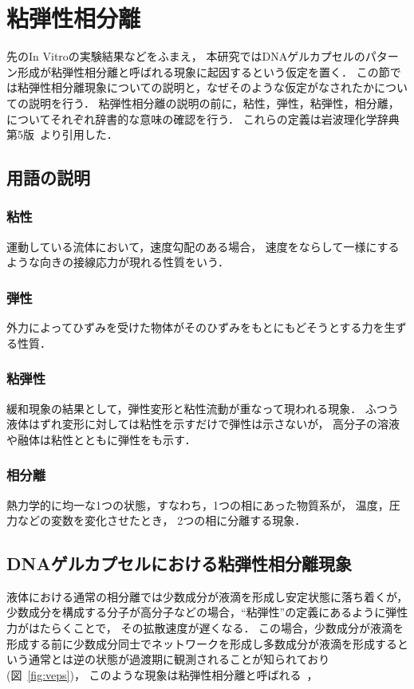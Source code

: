 \section{粘弾性相分離}

先のIn Vitroの実験結果などをふまえ，
本研究ではDNAゲルカプセルのパターン形成が粘弾性相分離と呼ばれる現象に起因するという仮定を置く．
この節では粘弾性相分離現象についての説明と，なぜそのような仮定がなされたかについての説明を行う．
粘弾性相分離の説明の前に，粘性，弾性，粘弾性，相分離，についてそれぞれ辞書的な意味の確認を行う．
これらの定義は岩波理化学辞典第5版~\cite{rikagakuiwanami}より引用した．

\subsection{用語の説明}

\subsubsection{粘性}
運動している流体において，速度勾配のある場合，
速度をならして一様にするような向きの接線応力が現れる性質をいう．

\subsubsection{弾性}
外力によってひずみを受けた物体がそのひずみをもとにもどそうとする力を生ずる性質．

\subsubsection{粘弾性}
緩和現象の結果として，弾性変形と粘性流動が重なって現われる現象．
ふつう液体はずれ変形に対しては粘性を示すだけで弾性は示さないが，
高分子の溶液や融体は粘性とともに弾性をも示す．

\subsubsection{相分離}
熱力学的に均一な1つの状態，すなわち，1つの相にあった物質系が，
温度，圧力などの変数を変化させたとき，
2つの相に分離する現象．

\subsection{DNAゲルカプセルにおける粘弾性相分離現象}
液体における通常の相分離では少数成分が液滴を形成し安定状態に落ち着くが，
少数成分を構成する分子が高分子などの場合，``粘弾性''の定義にあるように弾性力がはたらくことで，
その拡散速度が遅くなる．
この場合，少数成分が液滴を形成する前に少数成分同士でネットワークを形成し多数成分が液滴を形成するという通常とは逆の状態が過渡期に観測されることが知られており(図~\ref{fig:veps})，
このような現象は粘弾性相分離と呼ばれる~\cite{tanaka2009formation}，


